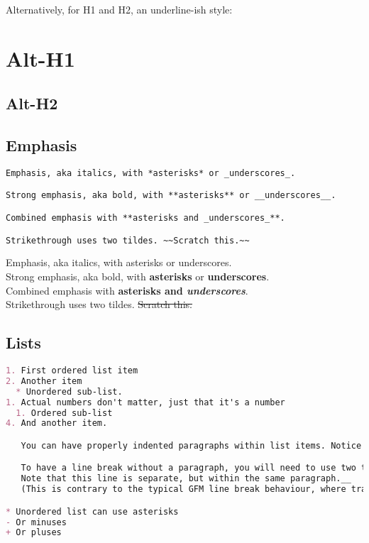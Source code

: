 \documentclass[a4paper, 11pt]{gfm}
\begin{document}
Alternatively, for H1 and H2, an underline-ish style:

\section{Alt-H1}

\subsection{Alt-H2}


\subsection{Emphasis}

\begin{lstlisting}[language=Markdown]
Emphasis, aka italics, with *asterisks* or _underscores_.

Strong emphasis, aka bold, with **asterisks** or __underscores__.

Combined emphasis with **asterisks and _underscores_**.

Strikethrough uses two tildes. ~~Scratch this.~~
\end{lstlisting}

Emphasis, aka italics, with asterisks or underscores. \\

Strong emphasis, aka bold, with \textbf{asterisks} or \textbf{underscores}. \\

Combined emphasis with \textbf{asterisks and \textit{underscores}}. \\

Strikethrough uses two tildes. \sout{Scratch this.}


\subsection{Lists}

\begin{lstlisting}[language=Markdown]
1. First ordered list item
2. Another item
  * Unordered sub-list.
1. Actual numbers don't matter, just that it's a number
  1. Ordered sub-list
4. And another item.

   You can have properly indented paragraphs within list items. Notice the blank line above, and the leading spaces (at least one, but we'll use three here to also align the raw Markdown).

   To have a line break without a paragraph, you will need to use two trailing spaces.__
   Note that this line is separate, but within the same paragraph.__
   (This is contrary to the typical GFM line break behaviour, where trailing spaces are not required.)

* Unordered list can use asterisks
- Or minuses
+ Or pluses
\end{lstlisting}
\end{document}
